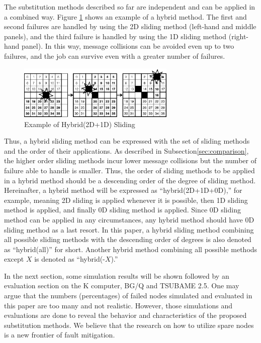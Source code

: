 \documentclass[Afour,times,sageh]{sagej}
\begin{document}
The substitution methods described so far are independent and can be
applied in a combined way. Figure \ref{fig:hybrid-sliding} shows an
example of a hybrid method. The first and second failures are handled
by using the 2D sliding method (left-hand and middle panels), and the
third failure is handled by using the 1D sliding method (right-hand
panel). In this way, message collisions can be avoided even up to two
failures, and the job can survive even with a greater number of
failures.

\begin{figure}[ht]
\centering
\includegraphics[width=75mm]{Figs/Hybrid.eps}
  \caption{Example of Hybrid(2D+1D) Sliding}
  \label{fig:hybrid-sliding}
\end{figure}

Thus, a hybrid sliding method can be expressed with the set of sliding
methods and the order of their applications. As described in
Subsection\ref{sec:comparison}, the higher order sliding methods incur
lower message collisions but the number of failure able to
handle is smaller. Thus, the order of sliding methods to be applied in
a hybrid method should be a descending order of the degree of sliding
method. Hereinafter, a hybrid method will be expressed as
``hybrid(2D+1D+0D),'' for example, meaning 2D sliding is applied
whenever it is possible, then 1D sliding method is applied, and
finally 0D sliding method is applied. Since 0D sliding method can be
applied in any circumstances, any hybrid method should have 0D sliding
method as a last resort. In this paper, a hybrid sliding method
combining all possible sliding methods with the descending order of
degrees is also denoted as ``hybrid(all)'' for short. Another hybrid
method combining all possible methods except $X$ is denoted as
``hybrid(-$X$).''

In the next section, some simulation results will be shown followed by
an evaluation section on the K computer, BG/Q and TSUBAME
2.5\citep{tsubame}. One may
argue that the numbers (percentages) of failed nodes simulated and
evaluated in this paper are too many and not realistic. However,
those simulations and evaluations are done to reveal the behavior and
characteristics of the proposed substitution methods. We believe that
the research on how to utilize spare nodes is a new frontier of fault
mitigation.
\end{document}
